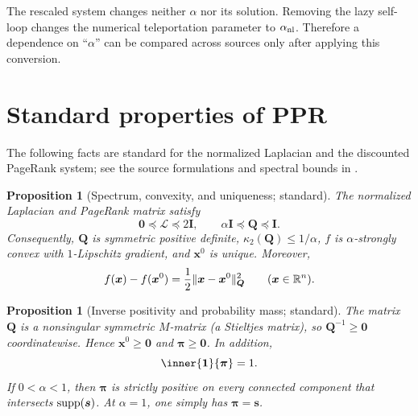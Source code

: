 \documentclass[11pt]{article}
\newtheorem{proposition}[theorem]{Proposition}
\theoremstyle{definition}
\theoremstyle{remark}
\theoremstyle{plain}
\begin{document}
The rescaled system changes neither $\alpha$ nor its solution.  Removing the
lazy self-loop changes the numerical teleportation parameter to
$\alpha_{\rm nl}$.  Therefore a dependence on ``$\alpha$'' can be compared
across sources only after applying this conversion.

\section{Standard properties of PPR}
\label{sec:problem-definitions-ppr-properties}

The following facts are standard for the normalized Laplacian and the
discounted PageRank system; see the source formulations and spectral bounds
in \citet{fountoulakis2019variational,fountoulakis2026complexity,
zhou2024iterative,huang2025accelerated}.

\begin{proposition}[Spectrum, convexity, and uniqueness; standard]
\label{prop:problem-definitions-spectrum}
The normalized Laplacian and PageRank matrix satisfy
\begin{equation}
    \bm{0}\preceq\bm{\mathcal{L}}\preceq2\bm{I},
    \qquad
    \alpha\bm{I}\preceq\bm{Q}\preceq\bm{I}.
    \label{eq:problem-definitions-spectrum}
\end{equation}
Consequently, $\bm{Q}$ is symmetric positive definite,
$\kappa_2(\bm{Q})\leq1/\alpha$, $f$ is $\alpha$-strongly convex with
$1$-Lipschitz gradient, and $\bm{x}^0$ is unique. Moreover,
\begin{equation}
    f(\bm{x})-f(\bm{x}^0)
    =\frac12\lVert\bm{x}-\bm{x}^0\rVert_{\bm{Q}}^2
    \qquad(\bm{x}\in\mathbb{R}^n).
    \label{eq:problem-definitions-quadratic-gap}
\end{equation}
\end{proposition}

\begin{proposition}[Inverse positivity and probability mass; standard]
\label{prop:problem-definitions-positivity}
The matrix $\bm{Q}$ is a nonsingular symmetric $M$-matrix (a Stieltjes
matrix), so $\bm{Q}^{-1}\geq\bm{0}$ coordinatewise. Hence
$\bm{x}^0\geq\bm{0}$ and $\bm{\pi}\geq\bm{0}$. In addition,
\begin{equation}
    \inner{\one}{\bm{\pi}}=1.
    \label{eq:problem-definitions-unit-mass}
\end{equation}
If $0<\alpha<1$, then $\bm{\pi}$ is strictly positive on every connected
component that intersects $\operatorname{supp}(\bm{s})$. At $\alpha=1$, one simply has
$\bm{\pi}=\bm{s}$.
\end{proposition}
\end{document}
